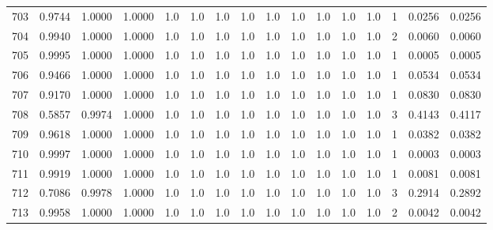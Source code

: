 \begin{tabular}{lrrrrrrrrrrrrrrr}
703 &      0.9744 &  1.0000 &  1.0000 &     1.0 &     1.0 &     1.0 &     1.0 &     1.0 &     1.0 &     1.0 &      1.0 &        1.0 &      1 &                    0.0256 &                     0.0256 \\
704 &      0.9940 &  1.0000 &  1.0000 &     1.0 &     1.0 &     1.0 &     1.0 &     1.0 &     1.0 &     1.0 &      1.0 &        1.0 &      2 &                    0.0060 &                     0.0060 \\
705 &      0.9995 &  1.0000 &  1.0000 &     1.0 &     1.0 &     1.0 &     1.0 &     1.0 &     1.0 &     1.0 &      1.0 &        1.0 &      1 &                    0.0005 &                     0.0005 \\
706 &      0.9466 &  1.0000 &  1.0000 &     1.0 &     1.0 &     1.0 &     1.0 &     1.0 &     1.0 &     1.0 &      1.0 &        1.0 &      1 &                    0.0534 &                     0.0534 \\
707 &      0.9170 &  1.0000 &  1.0000 &     1.0 &     1.0 &     1.0 &     1.0 &     1.0 &     1.0 &     1.0 &      1.0 &        1.0 &      1 &                    0.0830 &                     0.0830 \\
708 &      0.5857 &  0.9974 &  1.0000 &     1.0 &     1.0 &     1.0 &     1.0 &     1.0 &     1.0 &     1.0 &      1.0 &        1.0 &      3 &                    0.4143 &                     0.4117 \\
709 &      0.9618 &  1.0000 &  1.0000 &     1.0 &     1.0 &     1.0 &     1.0 &     1.0 &     1.0 &     1.0 &      1.0 &        1.0 &      1 &                    0.0382 &                     0.0382 \\
710 &      0.9997 &  1.0000 &  1.0000 &     1.0 &     1.0 &     1.0 &     1.0 &     1.0 &     1.0 &     1.0 &      1.0 &        1.0 &      1 &                    0.0003 &                     0.0003 \\
711 &      0.9919 &  1.0000 &  1.0000 &     1.0 &     1.0 &     1.0 &     1.0 &     1.0 &     1.0 &     1.0 &      1.0 &        1.0 &      1 &                    0.0081 &                     0.0081 \\
712 &      0.7086 &  0.9978 &  1.0000 &     1.0 &     1.0 &     1.0 &     1.0 &     1.0 &     1.0 &     1.0 &      1.0 &        1.0 &      3 &                    0.2914 &                     0.2892 \\
713 &      0.9958 &  1.0000 &  1.0000 &     1.0 &     1.0 &     1.0 &     1.0 &     1.0 &     1.0 &     1.0 &      1.0 &        1.0 &      2 &                    0.0042 &                     0.0042 \\

\end{tabular}
